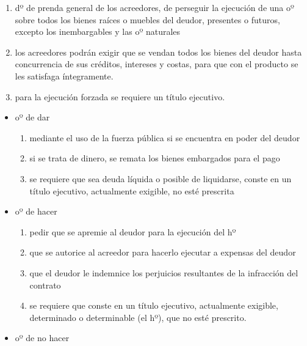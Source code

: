 \documentclass[]{article}
\providecommand{\tightlist}{%
  \setlength{\itemsep}{0pt}\setlength{\parskip}{0pt}}
\begin{document}
\begin{itemize}
\begin{itemize}
\begin{enumerate}
      \begin{enumerate}
      \def\labelenumii{\arabic{enumii}.}
      \tightlist
      \item
        dº de prenda general de los acreedores, de perseguir la
        ejecución de una oº sobre todos los bienes raíces o muebles del
        deudor, presentes o futuros, excepto los inembargables y las oº
        naturales
      \item
        los acreedores podrán exigir que se vendan todos los bienes del
        deudor hasta concurrencia de sus créditos, intereses y costas,
        para que con el producto se les satisfaga íntegramente.
      \item
        para la ejecución forzada se requiere un título ejecutivo.
      \end{enumerate}

      \begin{itemize}
      \item
        oº de dar

        \begin{enumerate}
        \def\labelenumii{\arabic{enumii}.}
        \tightlist
        \item
          mediante el uso de la fuerza pública si se encuentra en poder
          del deudor
        \item
          si se trata de dinero, se remata los bienes embargados para el
          pago
        \item
          se requiere que sea deuda líquida o posible de liquidarse,
          conste en un título ejecutivo, actualmente exigible, no esté
          prescrita
        \end{enumerate}
      \item
        oº de hacer

        \begin{enumerate}
        \def\labelenumii{\arabic{enumii}.}
        \tightlist
        \item
          pedir que se apremie al deudor para la ejecución del hº
        \item
          que se autorice al acreedor para hacerlo ejecutar a expensas
          del deudor
        \item
          que el deudor le indemnice los perjuicios resultantes de la
          infracción del contrato
        \item
          se requiere que conste en un título ejecutivo, actualmente
          exigible, determinado o determinable (el hº), que no esté
          prescrito.
        \end{enumerate}
      \item
        oº de no hacer


\end{itemize}
\end{enumerate}
\end{itemize}
\end{itemize}
\end{document}
